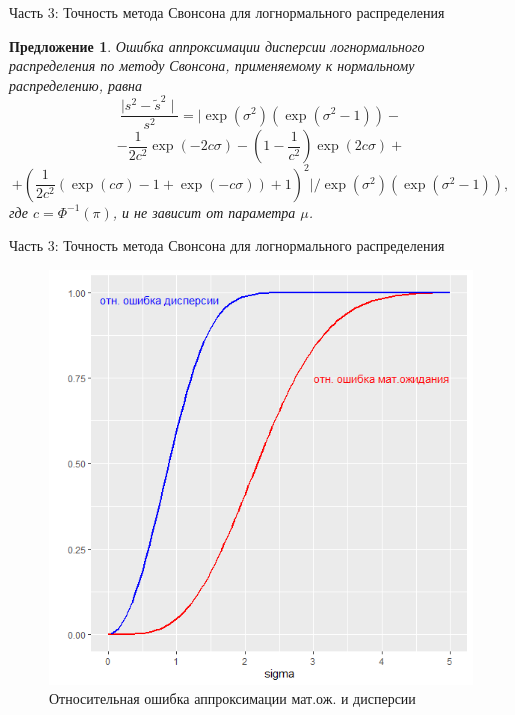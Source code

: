 \documentclass[ucs, notheorems, handout]{beamer}
\newtheorem{proposition2}[theorem]{Предложение}
\begin{document}
\begin{frame}{Часть 3: Точность метода Свонсона для логнормального распределения}
	\begin{proposition2}\label{pr6}
		Ошибка аппроксимации дисперсии логнормального распределения по методу Свонсона, применяемому к нормальному распределению, равна
		\[\dfrac{\mid s^{2} - \widetilde{s}^{2} \mid}{s^{2}} = \biggl|\exp(\sigma^{2})(\exp(\sigma^{2}-1)) -\]\[- \dfrac{1}{2c^{2}}\exp(-2c\sigma)- \left( 1- \dfrac{1}{c^{2}}\right) \exp(2c\sigma)+\]\[+ \left( \dfrac{1}{2c^{2}}(\exp(c\sigma)-1+\exp(-c\sigma)) + 1\right) ^{2}\biggr| /\exp(\sigma^{2})(\exp(\sigma^{2}-1)),\]
		где $c = \Phi^{-1}(\pi)$, и не зависит от параметра $\mu$.
		
		
	\end{proposition2}
\end{frame}

\begin{frame}{Часть 3: Точность метода Свонсона для логнормального распределения}

	\begin{figure}[h]
	\begin{center}
		\begin{minipage}[h]{0.6\linewidth}
			\includegraphics[width=1\linewidth]{img/par_new2.jpg}
			\caption{Относительная ошибка аппроксимации мат.ож. и дисперсии} %
			\label{ris:image2} %
		\end{minipage}
		
	\end{center}
\end{figure}

	
\end{frame}
	
\end{document}
